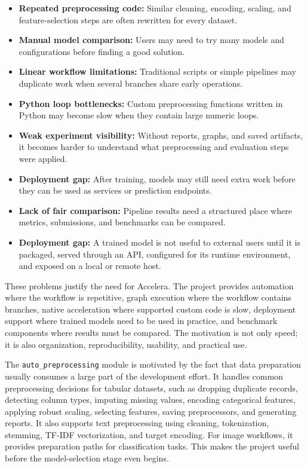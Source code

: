 \documentclass[12pt,a4paper]{report}
\begin{document}
\begin{itemize}
  \item \textbf{Repeated preprocessing code:} Similar cleaning, encoding,
  scaling, and feature-selection steps are often rewritten for every dataset.

  \item \textbf{Manual model comparison:} Users may need to try many models and
  configurations before finding a good solution.

  \item \textbf{Linear workflow limitations:} Traditional scripts or simple
  pipelines may duplicate work when several branches share early operations.

  \item \textbf{Python loop bottlenecks:} Custom preprocessing functions written
  in Python may become slow when they contain large numeric loops.

  \item \textbf{Weak experiment visibility:} Without reports, graphs, and saved
  artifacts, it becomes harder to understand what preprocessing and evaluation
  steps were applied.

  \item \textbf{Deployment gap:} After training, models may still need extra
  work before they can be used as services or prediction endpoints.

  \item \textbf{Lack of fair comparison:} Pipeline results need a structured
  place where metrics, submissions, and benchmarks can be compared.

  \item \textbf{Deployment gap:} A trained model is not useful to external
  users until it is packaged, served through an API, configured for its runtime
  environment, and exposed on a local or remote host.
\end{itemize}

\noindent These problems justify the need for Accelera. The project provides automation
where the workflow is repetitive, graph execution where the workflow contains
branches, native acceleration where supported custom code is slow, deployment
support where trained models need to be used in practice, and benchmark
components where results must be compared. The motivation is not only speed; it
is also organization, reproducibility, usability, and practical use.

\medskip
\noindent The \texttt{auto\_preprocessing} module is motivated by the fact that data
preparation usually consumes a large part of the development effort. It handles
common preprocessing decisions for tabular datasets, such as dropping duplicate
records, detecting column types, imputing missing values, encoding categorical
features, applying robust scaling, selecting features, saving preprocessors, and
generating reports. It also supports text preprocessing using cleaning,
tokenization, stemming, TF-IDF vectorization, and target encoding. For image
workflows, it provides preparation paths for classification
tasks. This makes the project useful before the model-selection stage even
begins.
\end{document}
